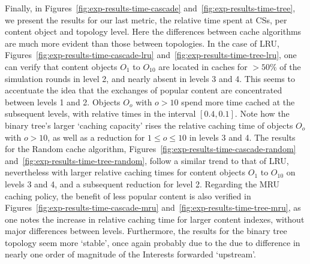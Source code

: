 Finally, in Figures~\ref{fig:exp-results-time-cascade} 
and~\ref{fig:exp-results-time-tree}, we present the results for our last 
metric, the relative time spent at CSs, per content object and topology level. 
Here the differences between cache algorithms are much more evident than those 
between topologies. In the case of LRU, Figures~\ref{fig:exp-results-time-cascade-lru} 
and~\ref{fig:exp-results-time-tree-lru}, one can verify that content objects $O_1$ 
to $O_{10}$ are located in caches for $> 50\%$ of the simulation rounds in 
level 2, and nearly absent in levels 3 and 4. This seems to accentuate the 
idea that the exchanges of popular content are concentrated between levels 1 and 2. 
Objects $O_o$ with $o > 10$ spend more time cached at the subsequent 
levels, with relative times in the interval $[0.4, 0.1]$. Note how the binary tree's 
larger `caching capacity' rises the relative caching time of objects 
$O_o$ with $o > 10$, as well as a reduction for $1 \le o \le 10$ in levels 3 
and 4. The results for the Random cache algorithm, Figures~\ref{fig:exp-results-time-cascade-random} 
and~\ref{fig:exp-results-time-tree-random}, follow a similar 
trend to that of LRU, nevertheless with larger relative caching times for content 
objects $O_1$ to $O_{10}$ on levels 3 and 4, and a subsequent reduction for 
level 2. Regarding the MRU caching policy, the benefit of less popular content 
is also verified in Figures~\ref{fig:exp-results-time-cascade-mru} 
and~\ref{fig:exp-results-time-tree-mru}, as one notes the increase in relative 
caching time for larger content indexes, without major differences between levels. 
Furthermore, the results for the binary tree topology seem more `stable', once again 
probably due to the due to difference in nearly one order of magnitude of the 
Interests forwarded `upstream'.

